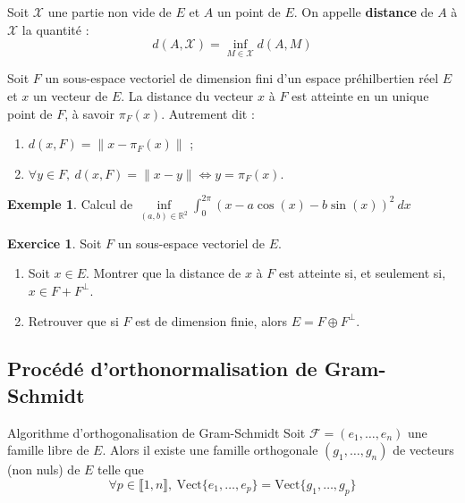 \documentclass[french]{article}
\newcommand{\R}{\mathbb{R}}
\theoremstyle{plain}
\theoremstyle{definition}
\newtheorem*{ex}{Exemple}
\newtheorem{exo}{Exercice}
\theoremstyle{remark}
\begin{document}
\begin{dfn}
	Soit $\mathcal{X}$ une partie non vide de $E$ et $A$ un point de $E$. On appelle \textbf{distance} de $A$ à $\mathcal{X}$ la quantité : $$d(A,\mathcal{X})=\underset{M\in\mathcal{X}}{\inf}d(A,M)$$
\end{dfn}

\begin{thm}{}
	Soit $F$ un sous-espace vectoriel de dimension fini d'un espace préhilbertien réel $E$ et $x$ un vecteur de $E$. La distance du vecteur $x$ à $F$ est atteinte en un unique point de $F$, à savoir $\pi_F(x)$. Autrement dit : 
	\begin{enumerate}
		\item $d(x,F)=\lVert x-\pi_F(x)\rVert$ ;
		\item $\forall y\in F,\ d(x,F)=\lVert x-y\rVert\iff y=\pi_F(x)$.
	\end{enumerate}
\end{thm}

\begin{ex}
	Calcul de $\displaystyle\underset{(a,b)\in\R^2}{\inf}\int_{0}^{2\pi}(x-a\cos(x)-b\sin(x))^2\ dx$
\end{ex}

\begin{exo}
	Soit $F$ un sous-espace vectoriel de $E$.
	\begin{enumerate}
		\item Soit $x\in E$. Montrer que la distance de $x$ à $F$ est atteinte si, et seulement si, $x\in F+F^\bot$.
		\item Retrouver que si $F$ est de dimension finie, alors $E=F\oplus F^\bot$.
	\end{enumerate}
\end{exo}

\subsection{Procédé d'orthonormalisation de Gram-Schmidt}

\begin{thm}{Algorithme d'orthogonalisation de Gram-Schmidt}
	Soit $\mathcal{F}=(e_1,\ldots,e_n)$ une famille libre de $E$. Alors il existe une famille orthogonale $(g_1,\ldots,g_n)$ de vecteurs (non nuls) de $E$ telle que $$\forall p\in\llbracket 1,n\rrbracket,\ \text{Vect}\{e_1,\ldots,e_p\}=\text{Vect}\{g_1,\ldots,g_p\}$$
\end{thm}
\end{document}
